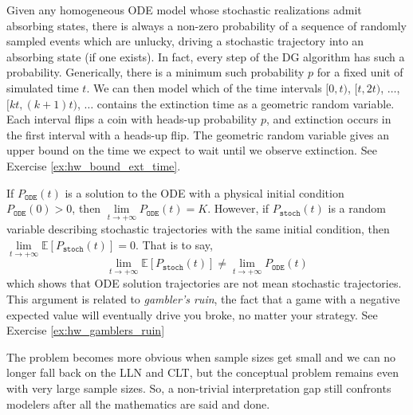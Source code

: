 Given any homogeneous ODE model whose stochastic realizations admit absorbing states, there is always a non-zero probability of a sequence of randomly sampled events which are unlucky, driving a stochastic trajectory into an absorbing state (if one exists). In fact, every step of the DG algorithm has such a probability. Generically, there is a minimum such probability $p$ for a fixed unit of simulated time $t$. We can then model which of the time intervals $[0, t)$, $[t, 2t)$, $\ldots$, $[kt, (k+1)t)$, $\ldots$ contains the extinction time as a geometric random variable. Each interval flips a coin with heads-up probability $p$, and extinction occurs in the first interval with a heads-up flip. The geometric random variable gives an upper bound on the time we expect to wait until we observe extinction. See Exercise \ref{ex:hw_bound_ext_time}.

If $P_{\texttt{ODE}}(t)$ is a solution to the ODE with a physical initial condition $P_{\texttt{ODE}}(0) > 0$, then $\underset{t \longrightarrow +\infty}{\lim} P_{\texttt{ODE}}(t) = K$. However, if $P_{\texttt{stoch}}(t)$ is a random variable describing stochastic trajectories with the same initial condition, then $\underset{t \longrightarrow +\infty}{\lim} \mathbb{E}[P_{\texttt{stoch}}(t)] = 0$. That is to say,
$$\underset{t \longrightarrow +\infty}{\lim} \mathbb{E}[P_{\texttt{stoch}}(t)] \neq \underset{t \longrightarrow +\infty}{\lim} P_{\texttt{ODE}}(t)$$ which shows that ODE solution trajectories are not mean stochastic trajectories. This argument is related to \textit{gambler's ruin}, the fact that a game with a negative expected value will eventually drive you broke, no matter your strategy. See Exercise \ref{ex:hw_gamblers_ruin}

The problem becomes more obvious when sample sizes get small and we can no longer fall back on the LLN and CLT, but the conceptual problem remains even with very large sample sizes. So, a non-trivial interpretation gap still confronts modelers after all the mathematics are said and done.\\


